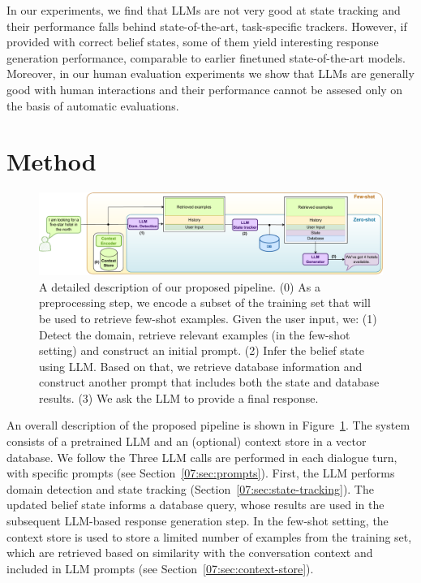 In our experiments, we find that LLMs are not very good at state tracking and their performance falls behind state-of-the-art, task-specific trackers.
However, if provided with correct belief states, some of them yield interesting response generation performance, comparable to earlier finetuned state-of-the-art models.
Moreover, in our human evaluation experiments we show that LLMs are generally good with human interactions and their performance cannot be assesed only on the basis of automatic evaluations.

\section{Method}
\label{07:sec:method}
\begin{figure}[t]
    \centering
    \includegraphics[width=\textwidth]{images/llm-chatbot-v3.pdf}
    \caption{A detailed description of our proposed pipeline. (0) As a preprocessing step, we encode a subset of the training set that will be used to retrieve few-shot examples.
    Given the user input, we: (1) Detect the domain, retrieve relevant examples (in the few-shot setting) and construct an initial prompt. (2) Infer the belief state using LLM. Based on that, we retrieve database information and construct another prompt that includes both the state and database results. (3) We ask the LLM to provide a final response.}
    \label{07:fig:overview_low_level}
\end{figure}
An overall description of the proposed pipeline is shown in Figure~\ref{07:fig:overview_low_level}.
The system consists of a pretrained LLM and an (optional) context store in a vector database.
We follow the 
Three LLM calls are performed in each dialogue turn, with specific prompts (see Section~\ref{07:sec:prompts}).
First, the LLM performs domain detection and state tracking (Section~\ref{07:sec:state-tracking}). The updated belief state informs a database query, whose results are used in the subsequent LLM-based response generation step.
In the few-shot setting, the context store is used to store a limited number of examples from the training set, which are retrieved based on similarity with the conversation context and included in LLM prompts (see Section~\ref{07:sec:context-store}).


